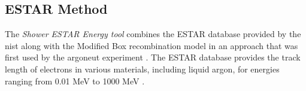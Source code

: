 \subsection{ESTAR Method}
The \textit{Shower ESTAR Energy tool} combines the ESTAR database provided by the \gls{nist} along with the Modified Box recombination model in an approach that was first used by the \Gls{argoneut} experiment \cite{ArgoNeuT_ESTAR_paper}. The ESTAR database provides the track length of electrons in various materials, including liquid argon, for energies ranging from 0.01 MeV to 1000 MeV \cite{ESTAR_Database}.

